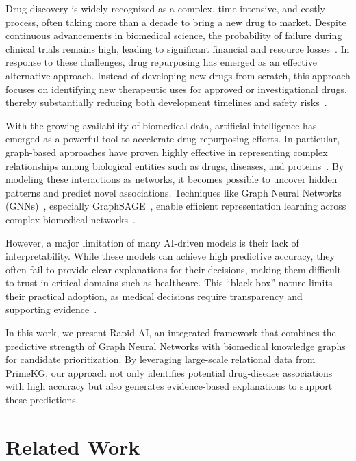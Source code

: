 \documentclass[preprint,12pt]{elsarticle}
\begin{document}
Drug discovery is widely recognized as a complex, time-intensive, and costly process, often taking more than a decade to bring a new drug to market. Despite continuous advancements in biomedical science, the probability of failure during clinical trials remains high, leading to significant financial and resource losses~\cite{ref6}. In response to these challenges, drug repurposing has emerged as an effective alternative approach. Instead of developing new drugs from scratch, this approach focuses on identifying new therapeutic uses for approved or investigational drugs, thereby substantially reducing both development timelines and safety risks~\cite{ref7}.

With the growing availability of biomedical data, artificial intelligence has emerged as a powerful tool to accelerate drug repurposing efforts. In particular, graph-based approaches have proven highly effective in representing complex relationships among biological entities such as drugs, diseases, and proteins~\cite{ref3,ref18}. By modeling these interactions as networks, it becomes possible to uncover hidden patterns and predict novel associations. Techniques like Graph Neural Networks (GNNs)~\cite{ref2,ref4}, especially GraphSAGE~\cite{ref1}, enable efficient representation learning across complex biomedical networks~\cite{ref17,ref24}.

However, a major limitation of many AI-driven models is their lack of interpretability. While these models can achieve high predictive accuracy, they often fail to provide clear explanations for their decisions, making them difficult to trust in critical domains such as healthcare. This ``black-box'' nature limits their practical adoption, as medical decisions require transparency and supporting evidence~\cite{ref4}.

In this work, we present Rapid AI, an integrated framework that combines the predictive strength of Graph Neural Networks with biomedical knowledge graphs for candidate prioritization. By leveraging large-scale relational data from PrimeKG, our approach not only identifies potential drug-disease associations with high accuracy but also generates evidence-based explanations to support these predictions.

\section{Related Work}
\end{document}
